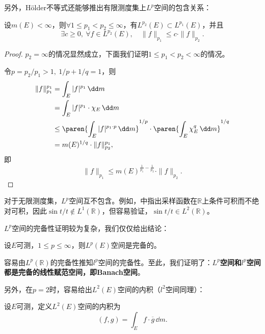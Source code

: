 另外，Hölder不等式还能够推出有限测度集上$L^p$空间的包含关系：
\begin{corollary}
    设$m(E)<\infty$，则$\forall 1\leq p_1<p_2\leq \infty$，有$L^{p_2}(E)\subset L^{p_1}(E)$，并且
    \begin{equation}
        \exists c\geq 0,\ \forall f\in L^{p_2}(E),\quad \|f\|_{p_1}\leq c\cdot \|f\|_{p_2}.
    \end{equation}
\end{corollary}
\begin{proof}
    $p_2=\infty$的情况显然成立，下面我们证明$1\leq p_1<p_2<\infty$的情况。

    令$p=p_2/p_1>1,\ 1/p+1/q=1$，则
    \begin{align}
        \|f\|_{p_1}^{p_1} & =\int_{E}|f|^{p_1}\,\dd m\nonumber                                                                      \\
                          & =\int_{E}|f|^{p_1}\cdot \chi_E\,\dd m\nonumber                                                          \\
                          & \leq \paren{\int_{E}|f|^{p_1\cdot p}\,\dd m}^{1/p}\cdot \paren{\int_{E}\chi_E^q\,\dd m}^{1/q}\nonumber \\
                          & =m(E)^{1/q}\cdot \|f\|_{p_2}^{p_1},
    \end{align}
    即
    \begin{equation}
        \|f\|_{p_1}\leq m(E)^{\frac{1}{p_1}-\frac{1}{p_2}}\cdot \|f\|_{p_2}.
    \end{equation}
\end{proof}

对于无限测度集，$L^p$空间互不包含。例如，中指出采样函数在$\mathbb{R}$上条件可积而不绝对可积，因此$\sin t/t\notin L^1(\mathbb{R})$，但容易验证，$\sin t/t\in L^2(\mathbb{R})$。

$L^p$空间的完备性证明较为复杂，我们仅仅给出结论：
\begin{claim}\label{claim:Lp_complete}
    设$E$可测，$1\leq p\leq \infty$，则$L^p(E)$空间是完备的。
\end{claim}
容易由$L^p(\mathbb{R})$的完备性推知$l^p$空间的完备性。至此，我们证明了：\textbf{$L^p$空间和$l^p$空间都是完备的线性赋范空间，即Banach空间}。

另外，在$p=2$时，容易给出$L^2(E)$空间的内积（$l^2$空间同理）：
\begin{definition}[$L^2$空间的内积]\label{def:L2_inner_product}
    设$E$可测，定义$L^2(E)$空间的内积为
    \begin{equation}
        (f,g)=\int_{E}f\cdot \overline{g}\,\dd m.
    \end{equation}
\end{definition}

